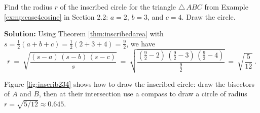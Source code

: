 \begin{exmp}
 Find the radius $r$ of the inscribed circle for the triangle $\triangle\,ABC$ from Example
 \ref{exmp:case4cosine} in Section 2.2: $a = 2$, $b = 3$, and $c = 4$. Draw the circle.

\piccaption[]{\label{fig:inscrib234}}
 \par\noindent\textbf{Solution:} Using Theorem \ref{thm:inscribedarea} with\\$s = \frac{1}{2}(a+b+c) =
 \frac{1}{2}(2+3+4) = \frac{9}{2}$, we have
 \begin{displaymath}
  r ~=~ \sqrt{\frac{(s-a)\,(s-b)\,(s-c)}{s}} ~=~
   \sqrt{\frac{\left(\frac{9}{2}-2\right)\,\left(\frac{9}{2}-3\right)\,\left(\frac{9}{2}-
   4\right)}{\frac{9}{2}}} ~=~ \sqrt{\frac{5}{12}}~.
 \end{displaymath}
 \par\noindent Figure \ref{fig:inscrib234} shows how to draw the inscribed circle: draw the
 bisectors of $A$ and $B$, then at their intersection use a compass to draw a circle of radius
 $r = \sqrt{5/12} \approx 0.645$.
\end{exmp}\vspace{-2mm}
\divider
\vspace{2mm}

